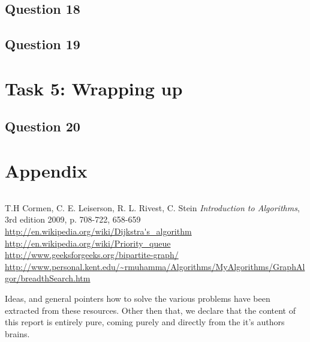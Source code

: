 \documentclass[a4paper]{article}
\begin{document}
\subsection*{Question 18}
\subsection*{Question 19}

\section{Task 5: Wrapping up}
\subsection*{Question 20}

\section{Appendix}

\begin{lstlisting}
\end{lstlisting}

\begin{thebibliography}{9}
		T.H Cormen, C. E. Leiserson, R. L. Rivest, C. Stein 	
				\textit{Introduction to Algorithms}, 3rd edition 2009, p. 708-722, 658-659 \\
		\url{http://en.wikipedia.org/wiki/Dijkstra's\_algorithm} \\
		\url{http://en.wikipedia.org/wiki/Priority\_queue} \\
		\url{http://www.geeksforgeeks.org/bipartite-graph/}
		\url{http://www.personal.kent.edu/~rmuhamma/Algorithms/MyAlgorithms/GraphAlgor/breadthSearch.htm}
\end{thebibliography}

Ideas, and general pointers how to solve the various problems have been extracted from these resources. Other then that, we declare that the content of this report is entirely pure, coming purely and directly from the it's authors brains.  
\end{document}
